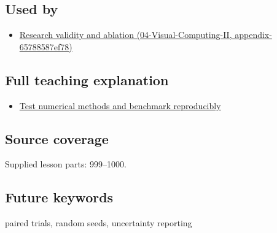 \subsection{Used by}\label{used-by}

\begin{itemize}
\tightlist
\item
  \href{}{Research validity and ablation (04-Visual-Computing-II, appendix-65788587ef78)}
\end{itemize}

\subsection{Full teaching explanation}\label{full-teaching-explanation}

\begin{itemize}
\tightlist
\item
  \href{Continuous\%20Notes/Computing\%20Foundations\%20-\%20From\%20Bits\%20to\%20C++\%20and\%20Systems\%20APIs\#Test\%20numerical\%20methods\%20and\%20benchmark\%20reproducibly}{Test numerical methods and benchmark reproducibly}
\end{itemize}

\subsection{Source coverage}\label{source-coverage}

Supplied lesson parts: 999--1000.

\subsection{Future keywords}\label{future-keywords}

paired trials, random seeds, uncertainty reporting
